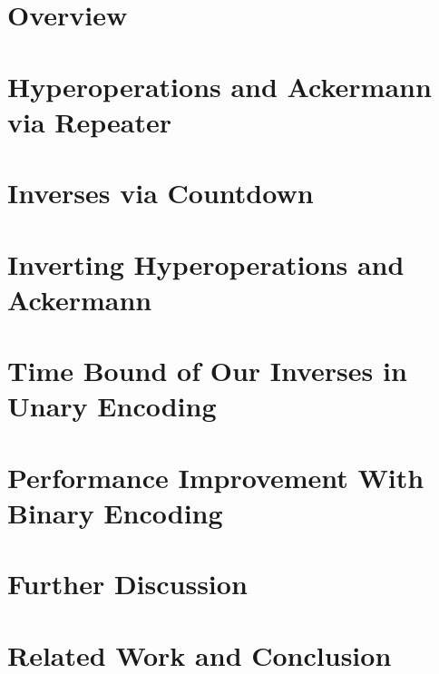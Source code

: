 \documentclass[runningheads]{llncs}
\begin{document}


\section{Overview}
\label{sec: overview}


\section{Hyperoperations and Ackermann via Repeater}
\label{sec: countdown-repeater}


\section{Inverses via Countdown}
\label{sec: countdown}


\section{Inverting Hyperoperations and Ackermann}
\label{sec: inv-hyperop}


\section{Time Bound of Our Inverses in Unary Encoding}
\label{sec: inv-ack}


\section{Performance Improvement With Binary Encoding}
\label{sec:binary}


\section{Further Discussion}
\label{sec: discussion}


\section{Related Work and Conclusion}



\end{document}
